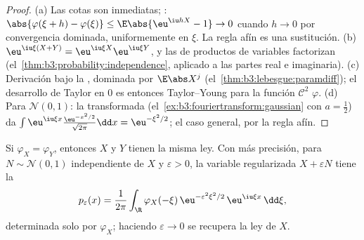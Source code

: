 \begin{proof}
(a) Las cotas son inmediatas;
: $\abs{\varphi(\xi + h)
- \varphi(\xi)} \leq \E\abs{\eu^{\iu hX} - 1} \to 0$ cuando $h
\to 0$ por convergencia dominada, uniformemente en $\xi$. La regla afín
es una sustitución. (b) $\eu^{\iu\xi(X+Y)} =
\eu^{\iu\xi X}\eu^{\iu\xi Y}$, y las
 de productos de variables
 factorizan
(el~\cref{thm:b3:probability:independence}, aplicado a las partes real e
imaginaria). (c) Derivación bajo la
, dominada por $\E\abs X^j$
(el~\cref{thm:b3:lebesgue:paramdiff}); el desarrollo de Taylor en $0$ es
entonces Taylor--Young para la función $\mathcal C^2$ $\varphi$. (d)
Para $\mathcal N(0,1)$: la transformada
(el~\cref{ex:b3:fouriertransform:gaussian} con $a = \frac12$) da
$\int\eu^{\iu\xi x}\frac{\eu^{-x^2/2}}{\sqrt{2\pi}}\dd
x = \eu^{-\xi^2/2}$; el caso general, por la regla afín.
\end{proof}

\begin{theorem}[Inyectividad]\label{thm:b3:clt:injectivity}
Si $\varphi_X = \varphi_Y$, entonces $X$ y $Y$ tienen la misma ley. Con
más precisión, para $N \sim \mathcal N(0,1)$
independiente de $X$ y
$\varepsilon > 0$, la variable regularizada $X +
\varepsilon N$ tiene la 
\[
p_\varepsilon(x) = \frac1{2\pi}\int_\R
\varphi_X(-\xi)\,\eu^{-\varepsilon^2\xi^2/2}\,
\eu^{\iu\xi x}\,\dd\xi ,
\]
determinada solo por $\varphi_X$; haciendo $\varepsilon \to 0$ se
recupera la ley de $X$.
\end{theorem}


